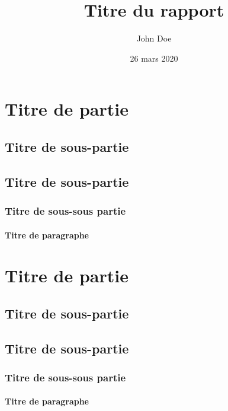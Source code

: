 \documentclass[nantes]{uge-report}              %
\title{Titre du rapport}                        %
\author{John Doe}                               %
\date{26 mars 2020}                             %
\begin{document}
\maketitle

\tableofcontents

\section{Titre de partie}
\subsection{Titre de sous-partie}

\lipsum[1-2]

\subsection{Titre de sous-partie}
\lipsum[3]
\subsubsection{Titre de sous-sous partie}
\lipsum[4-6]

\paragraph{Titre de paragraphe}
\lipsum[7]

\section{Titre de partie}
\subsection{Titre de sous-partie}

\lipsum[1-2]

\subsection{Titre de sous-partie}
\lipsum[3]
\subsubsection{Titre de sous-sous partie}
\lipsum[4-6]

\paragraph{Titre de paragraphe}
\lipsum[1-7]
\lipsum[1-7]
\lipsum[1-7]
\end{document}
